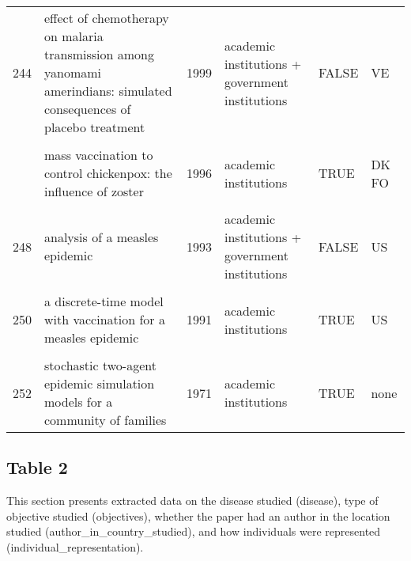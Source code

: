 \documentclass[
]{article}
\begin{document}
\begin{landscape}
\begin{longtable}{l>{\raggedright\arraybackslash}p{4cm}l>{\raggedright\arraybackslash}p{3.5cm}l>{\raggedright\arraybackslash}p{1.5cm}}
244 & effect of chemotherapy on malaria transmission among yanomami amerindians: simulated consequences of placebo treatment & 1999 & academic institutions + government institutions & FALSE & VE\\
\cellcolor{gray!6}{245} & \cellcolor{gray!6}{modelling vaccination strategy against directly transmitted diseases using a series of pulses} & \cellcolor{gray!6}{1998} & \cellcolor{gray!6}{academic institutions} & \cellcolor{gray!6}{TRUE} & \cellcolor{gray!6}{BR}\\
\addlinespace
246 & mass vaccination to control chickenpox: the influence of zoster & 1996 & academic institutions & TRUE & DK FO\\
\cellcolor{gray!6}{247} & \cellcolor{gray!6}{an evaluation of alternate control strategies for foot-and-mouth disease in australia: a regional approach} & \cellcolor{gray!6}{1995} & \cellcolor{gray!6}{government institutions + NGO} & \cellcolor{gray!6}{FALSE} & \cellcolor{gray!6}{AU}\\
248 & analysis of a measles epidemic & 1993 & academic institutions + government institutions & FALSE & US\\
\cellcolor{gray!6}{249} & \cellcolor{gray!6}{a model of the transmission of dengue fever with an evaluation of the impact of ultra-low volume (ulv) insecticide applications on dengue epidemics} & \cellcolor{gray!6}{1992} & \cellcolor{gray!6}{government institutions} & \cellcolor{gray!6}{FALSE} & \cellcolor{gray!6}{none}\\
250 & a discrete-time model with vaccination for a measles epidemic & 1991 & academic institutions & TRUE & US\\
\addlinespace
\cellcolor{gray!6}{251} & \cellcolor{gray!6}{a stochastic model of epidemics in military recruits} & \cellcolor{gray!6}{1982} & \cellcolor{gray!6}{government institutions} & \cellcolor{gray!6}{FALSE} & \cellcolor{gray!6}{US}\\
252 & stochastic two-agent epidemic simulation models for a community of families & 1971 & academic institutions & TRUE & none\\*
\end{longtable}
\endgroup{}
\end{landscape}

\hypertarget{table-2}{%
\subsection{Table 2}\label{table-2}}

This section presents extracted data on the disease studied (disease),
type of objective studied (objectives), whether the paper had an author
in the location studied (author\_in\_country\_studied), and how
individuals were represented (individual\_representation).
\end{document}
